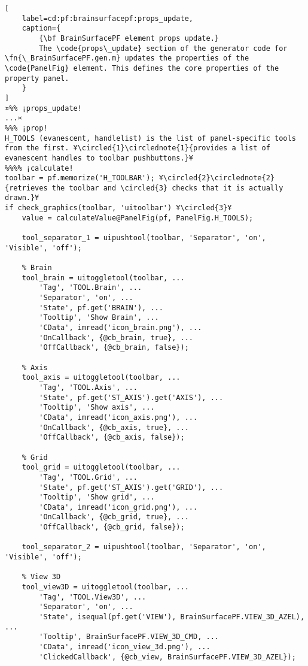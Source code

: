 \documentclass{tufte-handout}
\begin{document}
\begin{lstlisting}[
	label=cd:pf:brainsurfacepf:props_update,
	caption={
		{\bf BrainSurfacePF element props update.}
		The \code{props\_update} section of the generator code for \fn{\_BrainSurfacePF.gen.m} updates the properties of the \code{PanelFig} element. This defines the core properties of the property panel.
	}
]
¤%% ¡props_update!
...¤
%%% ¡prop!
H_TOOLS (evanescent, handlelist) is the list of panel-specific tools from the first. ¥\circled{1}\circlednote{1}{provides a list of evanescent handles to toolbar pushbuttons.}¥
%%%% ¡calculate!
toolbar = pf.memorize('H_TOOLBAR'); ¥\circled{2}\circlednote{2}{retrieves the toolbar and \circled{3} checks that it is actually drawn.}¥
if check_graphics(toolbar, 'uitoolbar') ¥\circled{3}¥
    value = calculateValue@PanelFig(pf, PanelFig.H_TOOLS);
    
    tool_separator_1 = uipushtool(toolbar, 'Separator', 'on', 'Visible', 'off');

    % Brain
    tool_brain = uitoggletool(toolbar, ...
        'Tag', 'TOOL.Brain', ...
        'Separator', 'on', ...
        'State', pf.get('BRAIN'), ...
        'Tooltip', 'Show Brain', ...
        'CData', imread('icon_brain.png'), ...
        'OnCallback', {@cb_brain, true}, ...
        'OffCallback', {@cb_brain, false});

    % Axis
    tool_axis = uitoggletool(toolbar, ...
        'Tag', 'TOOL.Axis', ...
        'State', pf.get('ST_AXIS').get('AXIS'), ...
        'Tooltip', 'Show axis', ...
        'CData', imread('icon_axis.png'), ...
        'OnCallback', {@cb_axis, true}, ...
        'OffCallback', {@cb_axis, false});

    % Grid
    tool_grid = uitoggletool(toolbar, ...
        'Tag', 'TOOL.Grid', ...
        'State', pf.get('ST_AXIS').get('GRID'), ...
        'Tooltip', 'Show grid', ...
        'CData', imread('icon_grid.png'), ...
        'OnCallback', {@cb_grid, true}, ...
        'OffCallback', {@cb_grid, false});
        
    tool_separator_2 = uipushtool(toolbar, 'Separator', 'on', 'Visible', 'off');

    % View 3D
    tool_view3D = uitoggletool(toolbar, ...
        'Tag', 'TOOL.View3D', ...
        'Separator', 'on', ... 
        'State', isequal(pf.get('VIEW'), BrainSurfacePF.VIEW_3D_AZEL), ...
        'Tooltip', BrainSurfacePF.VIEW_3D_CMD, ...
        'CData', imread('icon_view_3d.png'), ...
        'ClickedCallback', {@cb_view, BrainSurfacePF.VIEW_3D_AZEL});


\end{lstlisting}
\end{document}
